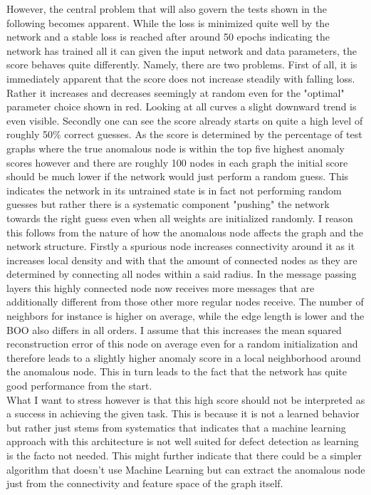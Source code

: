 \documentclass[11pt,a4paper]{article}
\begin{document}
However, the central problem that will also govern the tests shown in the following becomes apparent. 
While the loss is minimized quite well by the network and a stable loss is reached after around 50 epochs indicating the network has trained all it can given the input network and data parameters, the score behaves quite differently. 
Namely, there are two problems. 
First of all, it is immediately apparent that the score does not increase steadily with falling loss. 
Rather it increases and decreases seemingly at random even for the "optimal" parameter choice shown in red. 
Looking at all curves a slight downward trend is even visible. 
Secondly one can see the score already starts on quite a high level of roughly 50\% correct guesses. 
As the score is determined by the percentage of test graphs where the true anomalous node is within the top five highest anomaly scores however and there are roughly 100 nodes in each graph the initial score should be much lower if the network would just perform a random guess. 
This indicates the network in its untrained state is in fact not performing random guesses but rather there is a systematic component "pushing" the network towards the right guess even when all weights are initialized randomly. 
I reason this follows from the nature of how the anomalous node affects the graph and the network structure. 
Firstly a spurious node increases connectivity around it as it increases local density and with that the amount of connected nodes as they are determined by connecting all nodes within a said radius. 
In the message passing layers this highly connected node now receives more messages that are additionally different from those other more regular nodes receive. 
The number of neighbors for instance is higher on average, while the edge length is lower and the BOO also differs in all orders. 
I assume that this increases the mean squared reconstruction error of this node on average even for a random initialization and therefore leads to a slightly higher anomaly score in a local neighborhood around the anomalous node. 
This in turn leads to the fact that the network has quite good performance from the start. \\
What I want to stress however is that this high score should not be interpreted as a success in achieving the given task. 
This is because it is not a learned behavior but rather just stems from systematics that indicates that a machine learning approach with this architecture is not well suited for defect detection as learning is the facto not needed. 
This might further indicate that there could be a simpler algorithm that doesn't use Machine Learning but can extract the anomalous node just from the connectivity and feature space of the graph itself. \\
\end{document}
